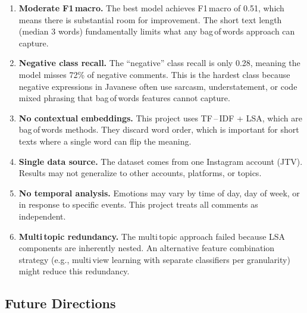 \documentclass[12pt,a4paper,twoside]{article}
\theoremstyle{definition}
\begin{document}
\begin{enumerate}[leftmargin=2em]
    \item \textbf{Moderate F1\,macro.} The best model achieves F1\,macro of 0.51, which means there is substantial room for improvement. The short text length (median 3 words) fundamentally limits what any bag\,of\,words approach can capture.

    \item \textbf{Negative class recall.} The ``negative'' class recall is only 0.28, meaning the model misses 72\% of negative comments. This is the hardest class because negative expressions in Javanese often use sarcasm, understatement, or code\,mixed phrasing that bag\,of\,words features cannot capture.

    \item \textbf{No contextual embeddings.} This project uses TF\,--\,IDF + LSA, which are bag\,of\,words methods. They discard word order, which is important for short texts where a single word can flip the meaning.

    \item \textbf{Single data source.} The dataset comes from one Instagram account (JTV). Results may not generalize to other accounts, platforms, or topics.

    \item \textbf{No temporal analysis.} Emotions may vary by time of day, day of week, or in response to specific events. This project treats all comments as independent.

    \item \textbf{Multi\,topic redundancy.} The multi\,topic approach failed because LSA components are inherently nested. An alternative feature combination strategy (e.g., multi\,view learning with separate classifiers per granularity) might reduce this redundancy.
\end{enumerate}

\subsection{Future Directions}
\end{document}
